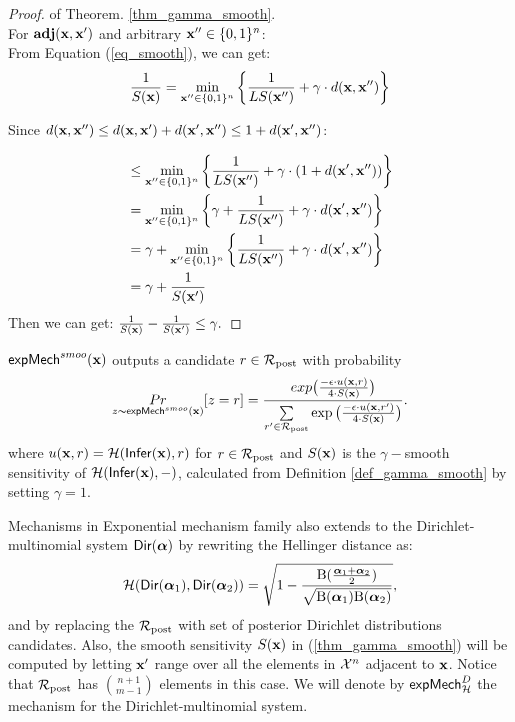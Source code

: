 \documentclass{article}
\begin{document}
\begin{proof}
of Theorem. \ref{thm_gamma_smooth}.\\
For $\textbf{adj}(\textbf{x},\textbf{x}')$ and arbitrary $\textbf{x}'' \in \{0,1\}^{n}$:\\
From Equation (\ref{eq_smooth}), we can get:
\[
\frac{1}{S(\textbf{x})} 
 = \min_{\textbf{x}'' \in \{0,1\}^{n}}\bigg \{ \frac{1}{LS(\textbf{x}'')} +\gamma \cdot d(\textbf{x},\textbf{x}'') \bigg \}\\
\]

Since $d(\textbf{x},\textbf{x}'') \leq d(\textbf{x},\textbf{x}') + d(\textbf{x}',\textbf{x}'') \leq 1 + d(\textbf{x}',\textbf{x}'')$:

\begin{equation*}
\begin{split}
& \leq \min_{\textbf{x}'' \in \{0,1\}^{n}}\bigg \{  \frac{1}{LS(\textbf{x}'')} +\gamma \cdot (1 + d(\textbf{x}',\textbf{x}'')) \bigg \}\\
& = \min_{\textbf{x}'' \in \{0,1\}^{n}}\bigg \{
\gamma + \frac{1}{LS(\textbf{x}'')} +\gamma \cdot d(\textbf{x}',\textbf{x}'')\bigg 
\}\\
& = \gamma + \min_{\textbf{x}'' \in \{0,1\}^{n}}\bigg \{
\frac{1}{LS(\textbf{x}'')} +\gamma \cdot d(\textbf{x}',\textbf{x}'')\bigg
\}\\
& = \gamma + \frac{1}{S(\textbf{x}')}
\end{split}
\end{equation*}
Then we can get:
$\frac{1}{S(\textbf{x})} - \frac{1}{S(\textbf{x}')} \leq \gamma.$
\end{proof}
 
\begin{definition}
\label{def_smoo_2}
$\mathsf{expMech}^{smoo}(\textbf{x})$ outputs a candidate $r \in \mathcal{R}_{\textup{post}}$ with probability
\begin{equation*}
  \underset{z \thicksim \mathsf{expMech}^{smoo}(\textbf{x})}{Pr}[z = r] = \frac {exp\big(\frac{-\epsilon\cdot u(\textbf{x}, {r})}{4\cdot S(\textbf{x})}\big)}
{\sum\limits_{r'\in \mathcal{R}_{\textup{post}}} \exp \big(\frac{-\epsilon\cdot u(\textbf{x}, r')}{4 \cdot S(\textbf{x})}\big)}.
\end{equation*}
where $u(\textbf{x}, {r}) = \mathcal{H}(\mathsf{Infer}(\textbf{x}),r)$ for $r \in \mathcal{R}_{\textup{post}}$ and $S(\textbf{x})$ is the $\gamma -$smooth sensitivity of $\mathcal{H}(\mathsf{Infer}(\textbf{x}),-)$, calculated from Definition \ref{def_gamma_smooth} by setting $\gamma = 1$.
\end{definition}
Mechanisms in Exponential mechanism family also extends to the Dirichlet-multinomial system $\mathsf{Dir}(\boldsymbol{\alpha})$ by rewriting the Hellinger distance as:
\[
  \mathcal{H}(\mathsf{Dir}(\boldsymbol{\alpha}_1), \mathsf{Dir}(\boldsymbol{\alpha}_2)) = \sqrt{1 - \frac{\textup{B}(\frac{\boldsymbol{\alpha}_1 + \boldsymbol{\alpha}_2}{2})}{\sqrt{\textup{B}(\boldsymbol{\alpha}_1) \textup{B}(\boldsymbol{\alpha}_2)}}},
\]
and by replacing the $\mathcal{R}_{\textup{post}}$ with set of posterior Dirichlet
distributions candidates. Also, the smooth sensitivity $S(\textbf{x})$
in (\ref{thm_gamma_smooth}) will be computed by letting $\textbf{x}'$ range
over all the elements in $\mathcal{X}^{n}$ adjacent to $\textbf{x}$. Notice
that $\mathcal{R}_{\textup{post}}$ has $\binom{n + 1}{m - 1}$ elements in this case. We
will denote by $\mathsf{expMech}^{D}_{\mathcal{H}}$ the mechanism for the
Dirichlet-multinomial system.
\end{document}
